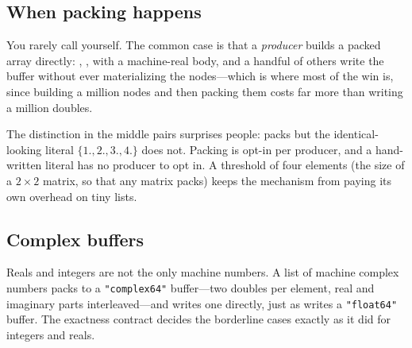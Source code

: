 \subsection{When packing happens}
\label{ssec:ds-auto}

You rarely call  yourself. The common case is that a \emph{producer}
builds a packed array directly: , ,  with a
machine-real body, and a handful of others write the buffer without ever
materializing the nodes---which is where most of the win is, since building a million
nodes and then packing them costs far more than writing a million doubles.

\begin{codepairs}
\end{codepairs}

The distinction in the middle pairs surprises people:  packs
but the identical-looking literal \(\{1., 2., 3., 4.\}\) does not. Packing is opt-in
per producer, and a hand-written literal has no producer to opt in. A threshold of
four elements (the size of a \(2\times2\) matrix, so that any matrix packs) keeps the
mechanism from paying its own overhead on tiny lists.

\subsection{Complex buffers}
\label{ssec:ds-complex}

Reals and integers are not the only machine numbers. A list of machine complex
numbers packs to a \texttt{"complex64"} buffer---two
doubles per element, real and imaginary parts interleaved---and 
writes one directly, just as  writes a \texttt{"float64"} buffer. The
exactness contract decides the borderline cases exactly as it did for integers and
reals.


